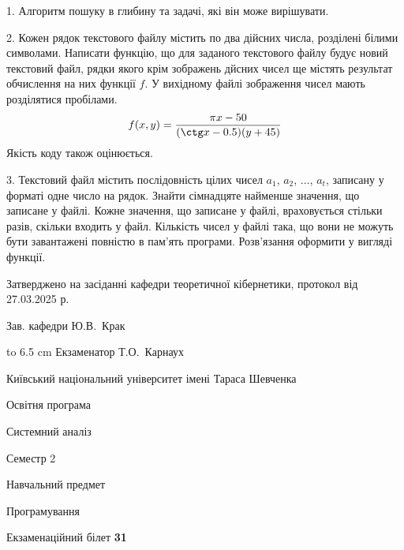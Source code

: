 \documentclass[12pt, ukrainian]{article}
\begin{document}
{%
1. Алгоритм пошуку в глибину та задачі, які він може вирішувати.%
\par
\vspace{2mm}

2. Кожен рядок текстового файлу містить по два дійсних числа, розділені білими символами.
Написати функцію, що для заданого текстового файлу будує новий текстовий файл, рядки якого крім зображень дйсних чисел ще містять результат обчислення на них функції $f$. У вихідному файлі зображення чисел мають розділятися пробілами. 
$$f(x, y) =\frac{\pi x - 50}{(\ctg x - 0.5) (y + 45)}$$ 
Якість коду також оцінюється.

\par
\vspace{2mm}

3. Текстовий файл містить послідовність цілих чисел $a_1$, $a_2$, $\ldots$, $a_t$, записану у форматі одне число на рядок. Знайти сімнадцяте найменше значення, що записане у файлі. Кожне значення, що записане у файлі, враховується стільки разів, скільки входить у файл. Кількість чисел у файлі така, що вони не можуть бути завантажені повністю в пам'ять програми. Розв'язання оформити у вигляді функції.

}
{\smallskip\smallskip \begin {scriptsize} Затверджено на засіданні кафедри теоретичної кібернетики, протокол   від   27.03.2025 р.\par\smallskip\smallskip\smallskip\smallskip
{\parbox {6.5 cm} {Зав. кафедри \dotfill Ю.В.~Крак}}\hspace {0.7cm} {\hbox to 6.5 cm { Екзаменатор \dotfill Т.О.~Карнаух}} \end{scriptsize}}
\newpage
{{\begin {scriptsize}\par
{ \center  Київський національний університет імені Тараса Шевченка \par}
{\parbox {5 cm}{Освітня програма \hfill}{\parbox {7 cm}{Системний аналіз\hfill}}\parbox {6 cm}{\hfill Семестр 2}}\par
{\parbox {5 cm} {Навчальний предмет \hfill}\parbox {7 cm}{Програмування \hfill}\parbox {6cm}{\hfill}\par}\vspace{-15pt} \end{scriptsize}}{\center Екзаменаційний білет \No \textbf { 31 }\par}}
\end{document}
